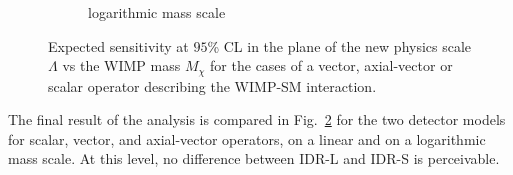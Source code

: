 \begin{figure}[htbp]
\begin{center}
\begin{subfigure}{0.49\hsize}
 \caption{logarithmic mass scale\label{fig:WIMP:limit:lowM}}
 \end{subfigure}
\end{center}
\caption{Expected sensitivity at $95$\% CL in the plane of the new physics scale $\Lambda$ vs the WIMP mass $M_{\chi}$ for the cases of a vector, axial-vector or scalar operator describing the WIMP-SM interaction.}
\label{fig:WIMP:limit}
\end{figure}

The final result of the analysis is compared in Fig.~\ref{fig:WIMP:limit} for the two detector models for scalar, vector, and axial-vector operators, on a linear and on a logarithmic mass scale. At this level, no difference between IDR-L and IDR-S is perceivable.

